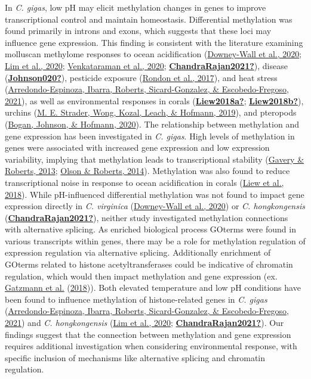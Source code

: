 \documentclass [11pt, proquest] {uwthesis}[2015/03/03]
\begin{document}
In \emph{C. gigas}, low pH may elicit methylation changes in genes to improve transcriptional control and maintain homeostasis. Differential methylation was found primarily in introns and exons, which suggests that these loci may influence gene expression. This finding is consistent with the literature examining molluscan methylome responses to ocean acidification (\protect\hyperlink{ref-Downey-Wall2020}{Downey-Wall et al., 2020}; \protect\hyperlink{ref-Lim2020}{Lim et al., 2020}; \protect\hyperlink{ref-Venkataraman2020}{Venkataraman et al., 2020}; \protect\hyperlink{ref-ChandraRajan2021}{\textbf{ChandraRajan2021?}}), disease (\protect\hyperlink{ref-Johnson020}{\textbf{Johnson020?}}), pesticide exposure (\protect\hyperlink{ref-Rondon2017}{Rondon et al., 2017}), and heat stress (\protect\hyperlink{ref-Arredondo-Espinoza2021}{Arredondo-Espinoza, Ibarra, Roberts, Sicard-Gonzalez, \& Escobedo-Fregoso, 2021}), as well as environmental responses in corals (\protect\hyperlink{ref-Liew2018a}{\textbf{Liew2018a?}}; \protect\hyperlink{ref-Liew2018b}{\textbf{Liew2018b?}}), urchins (\protect\hyperlink{ref-Strader2019}{M. E. Strader, Wong, Kozal, Leach, \& Hofmann, 2019}), and pteropods (\protect\hyperlink{ref-Bogan2020}{Bogan, Johnson, \& Hofmann, 2020}). The relationship between methylation and gene expression has been investigated in \emph{C. gigas}. High levels of methylation in genes were associated with increased gene expression and low expression variability, implying that methylation leads to transcriptional stability (\protect\hyperlink{ref-Gavery2013}{Gavery \& Roberts, 2013}; \protect\hyperlink{ref-Olson2014}{Olson \& Roberts, 2014}). Methylation was also found to reduce transcriptional noise in response to ocean acidification in corals (\protect\hyperlink{ref-Liew2018}{Liew et al., 2018}). While pH-influenced differential methylation was not found to impact gene expression directly in \emph{C. virginica} (\protect\hyperlink{ref-Downey-Wall2020}{Downey-Wall et al., 2020}) or \emph{C. hongkongensis} (\protect\hyperlink{ref-ChandraRajan2021}{\textbf{ChandraRajan2021?}}), neither study investigated methylation connections with alternative splicing. As enriched biological process GOterms were found in various transcripts within genes, there may be a role for methylation regulation of expression regulation via alternative splicing. Additionally enrichment of GOterms related to histone acetyltransferases could be indicative of chromatin regulation, which would then impact methylation and gene expression (ex. \protect\hyperlink{ref-Gatzmann2018}{Gatzmann et al.} (\protect\hyperlink{ref-Gatzmann2018}{2018})). Both elevated temperature and low pH conditions have been found to influence methylation of histone-related genes in \emph{C. gigas} (\protect\hyperlink{ref-Arredondo-Espinoza2021}{Arredondo-Espinoza, Ibarra, Roberts, Sicard-Gonzalez, \& Escobedo-Fregoso, 2021}) and \emph{C. hongkongensis} (\protect\hyperlink{ref-Lim2020}{Lim et al., 2020}; \protect\hyperlink{ref-ChandraRajan2021}{\textbf{ChandraRajan2021?}}). Our findings suggest that the connection between methylation and gene expression requires additional investigation when considering environmental response, with specific inclusion of mechanisms like alternative splicing and chromatin regulation.
\end{document}
